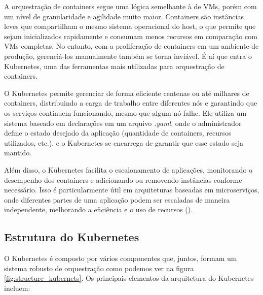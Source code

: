 A orquestração de containers segue uma lógica semelhante à de VMs, porém com um nível de granularidade e agilidade muito maior. Containers são instâncias leves que compartilham o mesmo sistema operacional do host, o que permite que sejam inicializados rapidamente e consumam menos recursos em comparação com VMs completas. No entanto, com a proliferação de containers em um ambiente de produção, gerenciá-los manualmente também se torna inviável. É aí que entra o Kubernetes, uma das ferramentas mais utilizadas para orquestração de containers.

O Kubernetes permite gerenciar de forma eficiente centenas ou até milhares de containers, distribuindo a carga de trabalho entre diferentes nós e garantindo que os serviços continuem funcionando, mesmo que algum nó falhe. Ele utiliza um sistema baseado em declarações em um arquivo \textit{.yaml}, onde o administrador define o estado desejado da aplicação (quantidade de containers, recursos utilizados, etc.), e o Kubernetes se encarrega de garantir que esse estado seja mantido.

Além disso, o Kubernetes facilita o escalonamento de aplicações, monitorando o desempenho dos containers e adicionando ou removendo instâncias conforme necessário. Isso é particularmente útil em arquiteturas baseadas em microserviços, onde diferentes partes de uma aplicação podem ser escaladas de maneira independente, melhorando a eficiência e o uso de recursos (\cite{KubernetsDocumentation}).

\subsection{Estrutura do Kubernetes}

O Kubernetes é composto por vários componentes que, juntos, formam um sistema robusto de orquestração como podemos ver na figura \ref{fig:structure_kubernets}. Os principais elementos da arquitetura do Kubernetes incluem:


